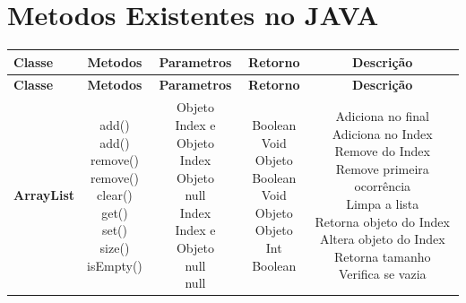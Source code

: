 \documentclass[a4paper,10pt]{article}
\begin{document}
\section{Metodos Existentes no JAVA}
\begin{center}
    \begin{longtable}{ |l|c|c|c|c| }
    \hline
        \textbf{Classe} & \textbf{Metodos} & \textbf{Parametros} & \textbf{Retorno} & \textbf{Descrição} \\ [0.5ex] \hline
    \endfirsthead
    \hline
        \textbf{Classe} & \textbf{Metodos} & \textbf{Parametros} & \textbf{Retorno} & \textbf{Descrição} \\ [0.5ex] \hline
    \endhead
    \hline
    \endfoot
    \hline
    \endlastfoot
        \textbf{ArrayList} & \makecell{ add() \\ add() \\ remove() \\ remove() \\ clear() \\ get() \\ set() \\ size() \\ isEmpty()} & \makecell{Objeto \\ Index e Objeto \\ Index \\  Objeto \\ null \\ Index \\ Index e Objeto \\ null \\ null} & \makecell{Boolean \\ Void \\ Objeto \\ Boolean \\ Void \\ Objeto \\ Objeto \\ Int \\ Boolean} & \makecell{Adiciona no final \\ Adiciona no Index \\ Remove do Index \\ Remove primeira ocorrência \\ Limpa a lista \\ Retorna objeto do Index \\ Altera objeto do Index \\ Retorna tamanho \\ Verifica se vazia} \\  \hline


\end{longtable}
\end{center}
\end{document}
